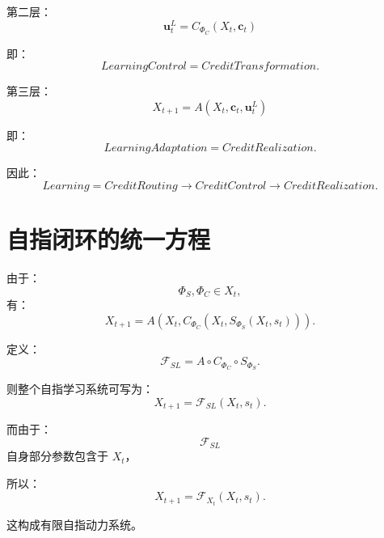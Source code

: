 第二层：
\begin{equation}
\boxed{
\mathbf{u}_t^L
=
C_{\Phi_C}
(
X_t,
\mathbf{c}_t
)
}
\end{equation}

即：
\begin{equation}
LearningControl
=
CreditTransformation.
\end{equation}

第三层：
\begin{equation}
\boxed{
X_{t+1}
=
A(
X_t,
\mathbf{c}_t,
\mathbf{u}_t^L
)
}
\end{equation}

即：
\begin{equation}
LearningAdaptation
=
CreditRealization.
\end{equation}

因此：
\begin{equation}
\boxed{
Learning
=
CreditRouting
\rightarrow
CreditControl
\rightarrow
CreditRealization.
}
\end{equation}


\section{自指闭环的统一方程}

由于：
\begin{equation}
\Phi_S,\Phi_C
\in
X_t,
\end{equation}
有：
\begin{equation}
X_{t+1}
=
A
\left(
X_t,
C_{\Phi_C}
\left(
X_t,
S_{\Phi_S}(X_t,s_t)
\right)
\right).
\end{equation}

定义：
\begin{equation}
\boxed{
\mathcal{F}_{SL}
=
A
\circ
C_{\Phi_C}
\circ
S_{\Phi_S}.
}
\end{equation}

则整个自指学习系统可写为：
\begin{equation}
\boxed{
X_{t+1}
=
\mathcal{F}_{SL}
(
X_t,s_t
).
}
\end{equation}

而由于：
\begin{equation}
\mathcal{F}_{SL}
\end{equation}
自身部分参数包含于 $X_t$，

所以：
\begin{equation}
\boxed{
X_{t+1}
=
\mathcal{F}_{X_t}
(
X_t,s_t
).
}
\end{equation}

这构成有限自指动力系统。


